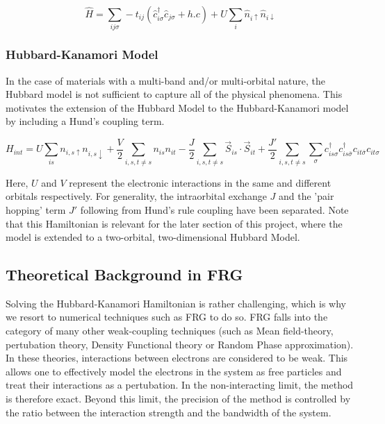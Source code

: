 \documentclass[12pt]{article}
\begin{document}
\begin{equation}\label{t Hubbard model}
    \hat{H} = \sum_{ij\sigma} -t_{ij}(\hat{c}_{i\sigma}^{\dagger}\hat{c}_{j \sigma} + h.c) 
    + U \sum_{i} \hat{n}_{i \uparrow} \hat{n}_{i \downarrow}
\end{equation}





\subsubsection{Hubbard-Kanamori Model}
\label{subsubsec: HKmodel}
In the case of materials with a multi-band and/or multi-orbital nature, the Hubbard model is not sufficient to capture all of the physical phenomena. This motivates the extension of the Hubbard Model to the Hubbard-Kanamori model\cite{sherman2020hubbard} by including a Hund's coupling term.

\begin{equation} \label{Hubbard-Kanamori Model}
    H_{int} = U \sum_{is}n_{i,s\uparrow}n_{i,s\downarrow} + \frac{V}{2} \sum_{i,s,t \neq s} n_{is}n_{it} -\frac{J}{2} \sum_{i,s,t \neq s} \vec{S}_{is} \cdot \vec{S}_{it} 
    + \frac{J'}{2} \sum_{i,s,t \neq s} \sum_{\sigma} c_{is\sigma}^{\dagger}c_{is\bar{\sigma}}^{\dagger}c_{it\bar{\sigma}}c_{it\sigma}
\end{equation}

\noindent Here, $U$ and $V$ represent the electronic interactions in the same and different orbitals respectively. For generality, the intraorbital exchange $J$ and the 'pair hopping' term $J'$ following from Hund's rule coupling have been separated.  
Note that this Hamiltonian is relevant for the later section of this project, where the model is extended to a two-orbital, two-dimensional Hubbard Model.

\subsection{Theoretical Background in FRG}

Solving the Hubbard-Kanamori Hamiltonian is rather challenging, which is why we resort to numerical techniques such as FRG to do so. FRG falls into the category of many other weak-coupling techniques (such as Mean field-theory\cite{kadanoff2009more}, pertubation theory\cite{nagaosa2013quantum}, Density Functional theory\cite{kohn1965self} or Random Phase approximation\cite{bohm1951collective}).
In these theories, interactions between electrons are considered to be weak. This allows one to effectively model the electrons in the system as free particles 
and treat their interactions as a pertubation. In the non-interacting limit, the method is therefore exact. Beyond this limit, the precision of the method is controlled by the ratio between the interaction
strength and the bandwidth of the system. 
\end{document}
